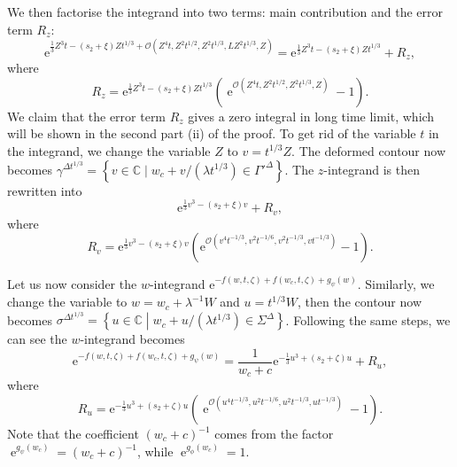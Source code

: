 \documentclass[cmp]{svjour}
\numberwithin{theorem}{section}
\numberwithin{equation}{section}
\DeclareMathOperator{\e}{e}
\begin{document}
We then factorise the integrand into two terms: main contribution and the error term $R_z$:
\begin{equation*}
	\mathrm{e}^{ \frac{1}{3} Z^3 t - (s_2 + \xi) Z t^{1/3}  + \mathcal{O}( Z^4 t , Z^2 t^{1/2} , Z^2 t^{1/3} , L Z^2 t^{1/3} , Z ) }
	=
	\mathrm{e}^{ \frac{1}{3} Z^3 t - (s_2 + \xi) Z t^{1/3} } + R_z,
\end{equation*}
where 
\begin{equation*}
	R_z =  \mathrm{e}^{ \frac{1}{3} Z^3 t - (s_2 + \xi) Z t^{1/3} }
	\left(
	\e^{\mathcal{O}( Z^4 t , Z^2 t^{1/2} , Z^2 t^{1/3} ,  Z ) } - 1
	\right).
\end{equation*}
We claim that the error term $R_z$ gives a zero integral in long time limit, which will be shown in the second part (ii) of the proof. To get rid of the variable $t$ in the integrand, we change the variable $Z $  to $v = t^{1/3} Z$. The deformed contour now becomes $\gamma^{\Delta t^{1/3}} = \left\{ v \in \mathbb{C} \mid w_c + v /(\lambda t^{1/3}) \in {\Gamma'}^{\Delta}  \right\}$. The $z$-integrand is then rewritten into
\begin{equation}\label{zRescKernel}
	\mathrm{e}^{ \frac{1}{3} v^3 - (s_2 + \xi) v } + R_v,
\end{equation}
where 
\begin{equation}
	R_v =  \mathrm{e}^{ \frac{1}{3} v^3 - (s_2 + \xi) v }
	\left(
	\mathrm{e}^{ \mathcal{O}( v^4 t^{-1/3} , v^2 t^{-1/6} , v^2 t^{-1/3} , v t^{-1/3} ) } - 1
	\right).
\end{equation}



Let us now consider the $w$-integrand $\mathrm{e}^{ - f(w, t,\zeta) + f(w_c , t, \zeta) + g_{\psi}(w) }$. Similarly, we change the variable to $w=w_c+\lambda^{-1}W$ and $u=t^{1/3}W$, then the contour now becomes $\sigma^{\Delta t^{1/3}}  = \left\{ u \in \mathbb{C} \middle| w_c +  u /(\lambda t^{1/3}) \in \Sigma^{\Delta}  \right\}$. Following the same steps, we can see the $w$-integrand becomes 
\begin{equation}\label{wRescKernel}
	\mathrm{e}^{ - f(w, t,\zeta) + f(w_c , t, \zeta) + g_{\psi}(w)}
	=
	\frac{1}{w_c + c}\mathrm{e}^{- \frac{1}{3} u^3 + (s_2 + \zeta) u } + R_u,
\end{equation}
where 
\begin{equation}
	R_u =  \mathrm{e}^{ -\frac{1}{3} u^3 + (s_2 + \zeta) u }
	\left(
	\e^{ \mathcal{O}( u^4 t^{-1/3} , u^2 t^{-1/6} , u^2 t^{-1/3} , u t^{-1/3} ) } - 1
	\right).
\end{equation}
Note that the coefficient $(w_c + c)^{-1}$ comes from the factor $\e^{g_{\psi}(w_c)}=(w_c + c)^{-1}$, while $\e^{g_{\phi}(w_c)}=1$. 
\end{document}
